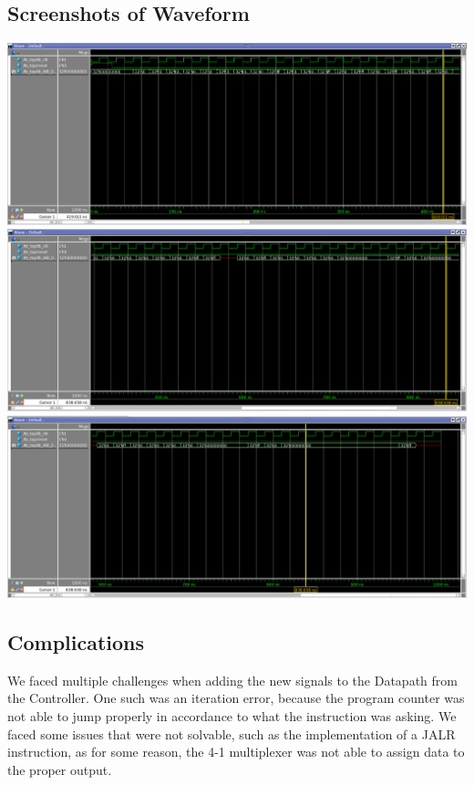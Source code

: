 \documentclass{article}
\begin{document}
		\subsection{Screenshots of Waveform}
			\includegraphics[width=1\textwidth]{waveform1.png}
			\includegraphics[width=1\textwidth]{waveform2.png}
			\includegraphics[width=1\textwidth]{waveform3.png}
		\subsection{Complications}
			We faced multiple challenges when adding the new signals to the Datapath from the Controller. One such was an iteration error, because the program
			counter was not able to jump properly in accordance to what the instruction was asking. We faced some issues that were not solvable, such as the
			implementation of a JALR instruction, as for some reason, the 4-1 multiplexer was not able to assign data to the proper output. 
		
\end{document}
